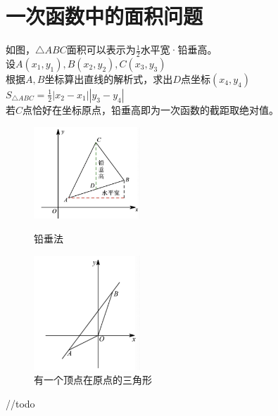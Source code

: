 \documentclass{ecnuthesis}
\begin{document}
\section{一次函数中的面积问题}
\begin{knowledge}
    如图，$\triangle ABC$面积可以表示为$\frac{1}{2}$水平宽·铅垂高。\\
    设$A(x_1,y_1),B(x_2,y_2),C(x_3,y_3)$ \\
    根据$A,B$坐标算出直线的解析式，求出$D$点坐标$(x_4,y_4)$ \\
    $S_{\triangle ABC}=\frac{1}{2}|x_2-x_1||y_3-y_4|$ \\
    若$C$点恰好在坐标原点，铅垂高即为一次函数的截距取绝对值。
\end{knowledge}
\begin{figure}[ht]
\centering
\begin{minipage}[t]{0.48\textwidth}
\centering
\includegraphics[width=4cm]{picture/4_7_1.png}
\caption{铅垂法}
\end{minipage}
\hfill
\begin{minipage}[t]{0.48\textwidth}
\centering
\includegraphics[width=4cm]{picture/4_7_2.png}
\caption{有一个顶点在原点的三角形}
\end{minipage}
\end{figure}
\begin{problem}
    //todo
\end{problem}
\clearpage
\end{document}
